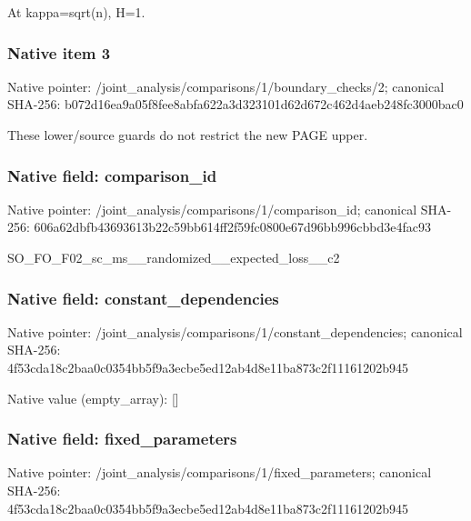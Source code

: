 \documentclass[10pt,a4paper]{article}
\begin{document}
\begingroup\raggedright\sloppy At kappa=\allowbreak{}sqrt(n),\allowbreak{} H=\allowbreak{}1.\par\endgroup

\subsubsection{Native item 3}
Native pointer: /joint\_\allowbreak{}analysis/comparisons/1/boundary\_\allowbreak{}checks/2; canonical SHA-256: b072d16ea9a05f8fee8abfa622a3d323101d62d672c462d4aeb248fc3000bac0

\begingroup\raggedright\sloppy These lower/\allowbreak{}source guards do not restrict the new PAGE upper.\par\endgroup

\subsubsection{Native field: comparison\_\allowbreak{}id}
Native pointer: /joint\_\allowbreak{}analysis/comparisons/1/comparison\_\allowbreak{}id; canonical SHA-256: 606a62dbfb43693613b22c59bb614ff2f59fc0800e67d96bb996cbbd3e4fac93

\begingroup\raggedright\sloppy SO\_\allowbreak{}FO\_\allowbreak{}F02\_\allowbreak{}sc\_\allowbreak{}ms\_\allowbreak{}\_\allowbreak{}randomized\_\allowbreak{}\_\allowbreak{}expected\_\allowbreak{}loss\_\allowbreak{}\_\allowbreak{}c2\par\endgroup

\subsubsection{Native field: constant\_\allowbreak{}dependencies}
Native pointer: /joint\_\allowbreak{}analysis/comparisons/1/constant\_\allowbreak{}dependencies; canonical SHA-256: 4f53cda18c2baa0c0354bb5f9a3ecbe5ed12ab4d8e11ba873c2f11161202b945

Native value (empty\_\allowbreak{}array): []

\subsubsection{Native field: fixed\_\allowbreak{}parameters}
Native pointer: /joint\_\allowbreak{}analysis/comparisons/1/fixed\_\allowbreak{}parameters; canonical SHA-256: 4f53cda18c2baa0c0354bb5f9a3ecbe5ed12ab4d8e11ba873c2f11161202b945
\end{document}
